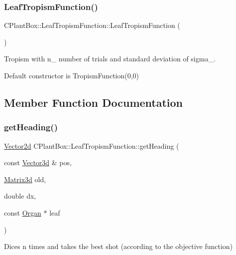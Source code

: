 \subsubsection{\texorpdfstring{Leaf\+Tropism\+Function()}{LeafTropismFunction()}\hspace{0.1cm}{\footnotesize\ttfamily [2/2]}}
{\footnotesize\ttfamily C\+Plant\+Box\+::\+Leaf\+Tropism\+Function\+::\+Leaf\+Tropism\+Function (\begin{DoxyParamCaption}{ }\end{DoxyParamCaption})\hspace{0.3cm}{\ttfamily [inline]}}



Tropism with n\+\_\+ number of trials and standard deviation of sigma\+\_\+. 

Default constructor is Tropism\+Function(0,0) 

\subsection{Member Function Documentation}
\mbox{\label{classCPlantBox_1_1LeafTropismFunction_a1440868221a834474e34e3a503a74572}} 
\subsubsection{\texorpdfstring{get\+Heading()}{getHeading()}}
{\footnotesize\ttfamily \hyperlink{classCPlantBox_1_1Vector2d}{Vector2d} C\+Plant\+Box\+::\+Leaf\+Tropism\+Function\+::get\+Heading (\begin{DoxyParamCaption}\item[{const \hyperlink{classCPlantBox_1_1Vector3d}{Vector3d} \&}]{pos,  }\item[{\hyperlink{classCPlantBox_1_1Matrix3d}{Matrix3d}}]{old,  }\item[{double}]{dx,  }\item[{const \hyperlink{classCPlantBox_1_1Organ}{Organ} $\ast$}]{leaf }\end{DoxyParamCaption})\hspace{0.3cm}{\ttfamily [virtual]}}



Dices n times and takes the best shot (according to the objective function) 


